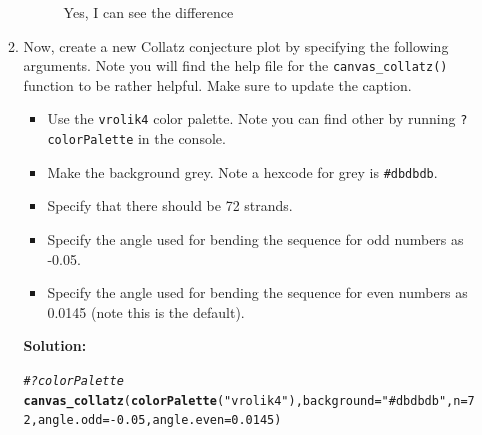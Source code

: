 \documentclass{article}\usepackage[]{graphicx}\usepackage[]{xcolor}
\makeatletter
\newcommand{\hlnum}[1]{\textcolor[rgb]{0.686,0.059,0.569}{#1}}%
\newcommand{\hlsng}[1]{\textcolor[rgb]{0.192,0.494,0.8}{#1}}%
\newcommand{\hlcom}[1]{\textcolor[rgb]{0.678,0.584,0.686}{\textit{#1}}}%
\newcommand{\hlopt}[1]{\textcolor[rgb]{0,0,0}{#1}}%
\newcommand{\hldef}[1]{\textcolor[rgb]{0.345,0.345,0.345}{#1}}%
\newcommand{\hlkwc}[1]{\textcolor[rgb]{0.333,0.667,0.333}{#1}}%
\newcommand{\hlkwd}[1]{\textcolor[rgb]{0.737,0.353,0.396}{\textbf{#1}}}%
\newenvironment{kframe}{%
 \def\at@end@of@kframe{}%
 \ifinner\ifhmode%
  \def\at@end@of@kframe{\end{minipage}}%
  \begin{minipage}{\columnwidth}%
 \fi\fi%
 \def\FrameCommand##1{\hskip\@totalleftmargin \hskip-\fboxsep
 \colorbox{shadecolor}{##1}\hskip-\fboxsep
     \hskip-\linewidth \hskip-\@totalleftmargin \hskip\columnwidth}%
 \MakeFramed {\advance\hsize-\width
   \@totalleftmargin\z@ \linewidth\hsize
   \@setminipage}}%
 {\par\unskip\endMakeFramed%
 \at@end@of@kframe}
\newenvironment{knitrout}{}{} %
\makeatother
\begin{document}
\begin{enumerate}
\begin{enumerate}
\begin{figure}[H]
\begin{center}
\caption{Yes, I can see the difference}
\label{CollatzPlot2}
\end{center}
\end{figure}
  \item Now, create a new Collatz conjecture plot by specifying the following 
  arguments. Note you will find the help file for the \texttt{canvas\_collatz()} 
  function to be rather helpful. Make sure to update the caption.
  \begin{itemize}
  \item Use the \texttt{vrolik4} color palette. Note you can find other by running 
  \texttt{?colorPalette} in the console.
  \item Make the background grey. Note a hexcode for grey is \texttt{\#dbdbdb}.
  \item Specify that there should be 72 strands.
  \item Specify the angle used for bending the sequence for odd numbers as -0.05.
  \item Specify the angle used for bending the sequence for even numbers as 0.0145 
  (note this is the default).
  \end{itemize}
\textbf{Solution:}
\begin{knitrout}\scriptsize
{}\color{fgcolor}\begin{kframe}
\begin{alltt}
 \hlcom{#?colorPalette}
 \hlkwd{canvas_collatz}\hldef{(}\hlkwd{colorPalette}\hldef{(}\hlsng{"vrolik4"}\hldef{),} \hlkwc{background} \hldef{=} \hlsng{"#dbdbdb"}\hldef{,} \hlkwc{n} \hldef{=} \hlnum{72}\hldef{,} \hlkwc{angle.odd} \hldef{=} \hlopt{-}\hlnum{0.05}\hldef{,} \hlkwc{angle.even} \hldef{=} \hlnum{0.0145}\hldef{)}
\end{alltt}
\end{kframe}
\end{knitrout}
\begin{figure}[H]
\begin{center}
\begin{knitrout}
\color{fgcolor}

\end{knitrout}
\end{center}
\end{figure}
\end{enumerate}
\end{enumerate}
\end{document}
